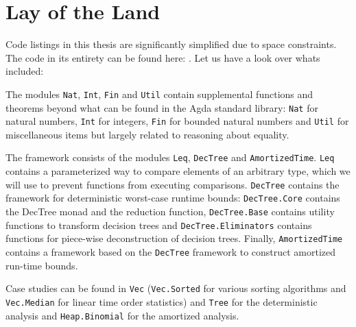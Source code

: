
\chapter{Lay of the Land}
\label{ch:layoftheland}
Code listings in this thesis are significantly simplified due to space constraints. The code in its entirety can be found here: . Let us have a look over whats included:

The modules \texttt{Nat}, \texttt{Int}, \texttt{Fin} and \texttt{Util} contain supplemental functions and theorems beyond what can be found in the Agda standard library: \texttt{Nat} for natural numbers, \texttt{Int} for integers, \texttt{Fin} for bounded natural numbers and \texttt{Util} for miscellaneous items but largely related to reasoning about equality.

The framework consists of the modules \texttt{Leq}, \texttt{DecTree} and \texttt{AmortizedTime}. \texttt{Leq} contains a parameterized way to compare elements of an arbitrary type, which we will use to prevent functions from executing comparisons. \texttt{DecTree} contains the framework for deterministic worst-case runtime bounds: \texttt{DecTree.Core} contains the DecTree monad and the reduction function, \texttt{DecTree.Base} contains utility functions to transform decision trees and \texttt{DecTree.Eliminators} contains functions for piece-wise deconstruction of decision trees. Finally, \texttt{AmortizedTime} contains a framework based on the \texttt{DecTree} framework to construct amortized run-time bounds.

Case studies can be found in \texttt{Vec} (\texttt{Vec.Sorted} for various sorting algorithms and \texttt{Vec.Median} for linear time order statistics) and \texttt{Tree} for the deterministic analysis and \texttt{Heap.Binomial} for the amortized analysis.